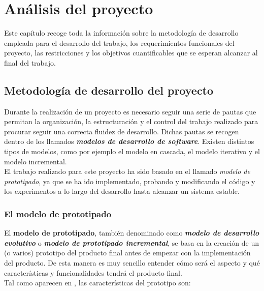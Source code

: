
\chapter{Análisis del proyecto} \label{analisis_proyecto}


Este capítulo recoge toda la información sobre la metodología de desarrollo empleada para el desarrollo del trabajo, los requerimientos  funcionales del proyecto, las restricciones y los objetivos cuantificables que se esperan alcanzar al final del trabajo.

\section{Metodología de desarrollo del proyecto}

Durante la realización de un proyecto es necesario seguir una serie de pautas que permitan la organización, la estructuración y el control del trabajo realizado para procurar seguir una correcta fluidez de desarrollo. Dichas pautas se recogen dentro de los llamados \textbf{\textit{modelos de desarrollo de software}}. Existen distintos tipos de modelos, como por ejemplo el modelo en cascada, el modelo iterativo y el modelo incremental. \\ 

El trabajo realizado para este proyecto ha sido basado en el llamado \textit{modelo de prototipado}, ya que se ha ido implementado, probando y modificando el código y los experimentos a lo largo del desarrollo hasta alcanzar un sistema estable. 

\subsection{El modelo de prototipado}

El \textbf{modelo de prototipado}, también denominado como \textbf{\textit{modelo de desarrollo evolutivo}} o \textbf{\textit{modelo de prototipado incremental}}, se basa en la creación de un (o varios) prototipo del producto final antes de empezar con la implementación del producto. De esta manera es muy sencillo entender cómo será el aspecto y qué características y funcionalidades tendrá el producto final. \\

Tal como aparecen en \cite{modeloPrototipos2}, las características del prototipo son: 

